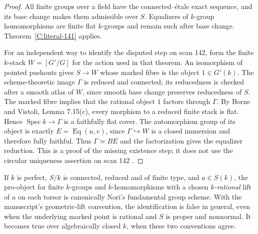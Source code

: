 \begin{proof}
All finite groups over a field have the connected--\'etale exact
sequence, and its base change makes them admissible over $S$.
Equalizers of $k$-group homomorphisms are finite flat $k$-groups and
remain such after base change.  Theorem~\ref{C:literal-141} applies.

For an independent way to identify the disputed step on scan 142, form
the finite $k$-stack $W=[G'/G]$ for the action used in that theorem.
An isomorphism of pointed pushouts gives $S\to W$ whose marked fibre
is the object $1\in G'(k)$.  The scheme-theoretic image $\Gamma$ is
reduced and connected; its reducedness is checked after a smooth atlas
of $W$, since smooth base change preserves reducedness of $S$.
The marked fibre implies that the rational object $1$ factors through
$\Gamma$.  By Borne and Vistoli, Lemma 7.15(c), every morphism to a
reduced finite stack is flat.  Hence
$\operatorname{Spec}k\to\Gamma$ is a faithfully flat cover.  The
automorphism group of its object is exactly $E=\operatorname{Eq}(u,v)$,
since $\Gamma\hookrightarrow W$ is a closed immersion and therefore
fully faithful.  Thus $\Gamma\simeq BE$ and the factorization gives
the equalizer reduction.  This is a proof of the missing existence
step; it does not use the circular uniqueness assertion on scan 142
\cite[Lemma~7.15(c)]{C_BorneVistoli2015}.
\end{proof}

\begin{corollary}
\label{C:nori}
If $k$ is perfect, $S/k$ is connected, reduced and of finite type, and
$a\in S(k)$, the pro-object for finite $k$-groups and
$k$-homomorphisms with a chosen \emph{$k$-rational} lift of $a$ on
each torsor is canonically Nori's fundamental group scheme.
With the manuscript's geometric-lift convention, the identification
is false in general, even when the underlying marked point is rational
and $S$ is proper and nonnormal.  It becomes true over algebraically
closed $k$, when these two conventions agree.
\end{corollary}

